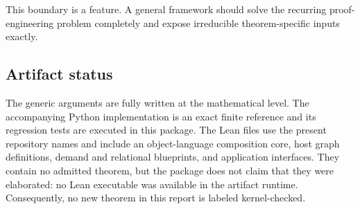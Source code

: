 This boundary is a feature.  A general framework should solve the recurring proof-engineering problem completely and expose irreducible theorem-specific inputs exactly.

\subsection{Artifact status}

The generic arguments are fully written at the mathematical level.  The accompanying Python implementation is an exact finite reference and its regression tests are executed in this package.  The Lean files use the present repository names and include an object-language composition core, host graph definitions, demand and relational blueprints, and application interfaces.  They contain no admitted theorem, but the package does not claim that they were elaborated: no Lean executable was available in the artifact runtime.  Consequently, no new theorem in this report is labeled kernel-checked.
